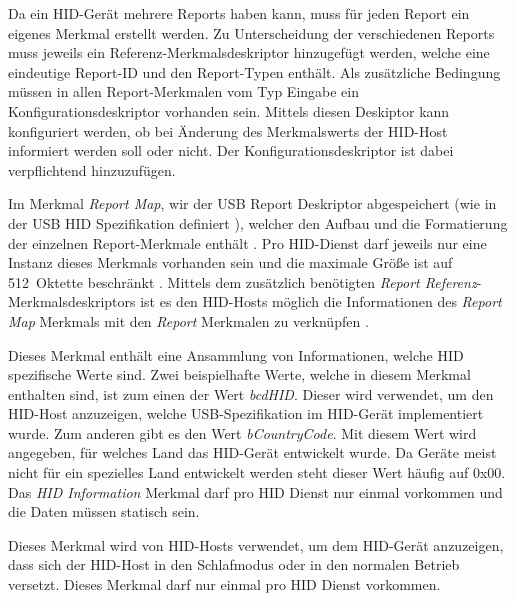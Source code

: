 Da ein \acs{HID}-Gerät mehrere Reports haben kann, muss für jeden Report ein eigenes Merkmal erstellt werden. Zu Unterscheidung der verschiedenen Reports muss jeweils ein Referenz-Merkmalsdeskriptor hinzugefügt werden, welche eine eindeutige Report-ID und den Report-Typen enthält. Als zusätzliche Bedingung müssen in allen Report-Merkmalen vom Typ Eingabe ein Konfigurationsdeskriptor vorhanden sein. Mittels diesen Deskiptor kann konfiguriert werden, ob bei Änderung des Merkmalswerts der \acs{HID}-Host informiert werden soll oder nicht. Der Konfigurationsdeskriptor ist dabei verpflichtend hinzuzufügen. \cite[S.~14.f]{bluetoothHIDS}

Im Merkmal \textit{Report Map}, wir der USB Report Deskriptor abgespeichert (wie in der USB \acs{HID} Spezifikation definiert \cite[S.~21]{bluetoothHOGP}), welcher den Aufbau und die Formatierung der einzelnen Report-Merkmale enthält \cite[S.~11]{bluetoothHIDS}. Pro \acs{HID}-Dienst darf jeweils nur eine Instanz dieses Merkmals vorhanden sein und die maximale Größe ist auf 512~Oktette beschränkt \cite[S.~16]{bluetoothHIDS}. Mittels dem zusätzlich benötigten \textit{Report Referenz}-Merkmalsdeskriptors ist es den \acs{HID}-Hosts möglich die Informationen des \textit{Report Map} Merkmals mit den \textit{Report} Merkmalen zu verknüpfen \cite[S.~17]{bluetoothHIDS}.

Dieses Merkmal enthält eine Ansammlung von Informationen, welche \acs{HID} spezifische Werte sind. Zwei beispielhafte Werte, welche in diesem Merkmal enthalten sind, ist zum einen der Wert \textit{bcdHID}. Dieser wird verwendet, um den \acs{HID}-Host anzuzeigen, welche USB-Spezifikation im \acs{HID}-Gerät implementiert wurde. Zum anderen gibt es den Wert \textit{bCountryCode}. Mit diesem Wert wird angegeben, für welches Land das \acs{HID}-Gerät entwickelt wurde. Da Geräte meist nicht für ein spezielles Land entwickelt werden steht dieser Wert häufig auf 0x00. Das \textit{\acs{HID} Information} Merkmal darf pro \acs{HID} Dienst nur einmal vorkommen und die Daten müssen statisch sein. \cite[S.~20f.]{bluetoothHIDS}

Dieses Merkmal wird von \acs{HID}-Hosts verwendet, um dem \acs{HID}-Gerät anzuzeigen, dass sich der \acs{HID}-Host in den Schlafmodus oder in den normalen Betrieb versetzt. Dieses Merkmal darf nur einmal pro \acs{HID} Dienst vorkommen. \cites[S.~23]{bluetoothHOGP}[S.~21]{bluetoothHIDS}

